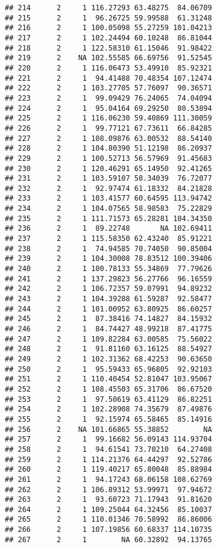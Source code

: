 \documentclass[
]{article}
\begin{document}
\begin{verbatim}
## 214      2     1 116.27293 63.48275  84.06709
## 215      2     1  96.26725 59.99588  61.31248
## 216      2     1 100.05098 55.27259 101.04213
## 217      2     1 102.24494 60.10248  86.81044
## 218      2     1 122.58310 61.15046  91.98422
## 219      2    NA 102.55585 66.69756  91.52545
## 220      2     1 116.06473 53.49910  85.92321
## 221      2     1  94.41488 70.48354 107.12474
## 222      2     1 103.27705 57.76097  90.36571
## 223      2     1  99.09429 76.24065  74.04094
## 224      2     1  95.04164 69.29250  80.53894
## 225      2     1 116.06230 59.40869 111.30059
## 226      2     1  99.77121 67.73611  66.84285
## 227      2     1 108.09876 63.00532  88.54140
## 228      2     1 104.80390 51.12198  86.20937
## 229      2     1 100.52713 56.57969  91.45683
## 230      2     1 120.46291 65.14950  92.41265
## 231      2     1 103.59107 58.34039  76.72077
## 232      2     1  92.97474 61.18332  84.21828
## 233      2     1 103.41577 60.64595 113.94742
## 234      2     1 104.07565 58.98583  75.22829
## 235      2     1 111.71573 65.28281 104.34350
## 236      2     1  89.22748       NA 102.69411
## 237      2     1 115.58350 62.43240  85.91221
## 238      2     1  74.94585 70.74050  90.85004
## 239      2     1 104.30008 78.83512 100.39406
## 240      2     1 100.78133 55.34869  77.79626
## 241      2     1 137.29823 56.27766  96.16559
## 242      2     1 106.72357 59.07991  94.89232
## 243      2     1 104.39288 61.59287  92.58477
## 244      2     1 101.00952 63.80925  86.60257
## 245      2     1  87.38416 74.14827  84.15932
## 246      2     1  84.74427 48.99218  87.41775
## 247      2     1 109.82284 63.00585  75.56022
## 248      2     1  91.81160 63.16125  88.54927
## 249      2     1 102.31362 68.42253  90.63650
## 250      2     1  95.59433 65.96805  92.92103
## 251      2     1 110.40454 52.81047 103.95067
## 252      2     1 108.45503 65.31706  86.67520
## 253      2     1  97.50619 63.41129  86.82251
## 254      2     1 102.28908 74.35679  87.49876
## 255      2     1  92.15974 65.58465  85.14916
## 256      2    NA 101.66865 55.38852        NA
## 257      2     1  99.16682 56.09143 114.93704
## 258      2     1  94.61541 73.70210  64.27408
## 259      2     1 114.21376 64.44297  92.52786
## 260      2     1 119.40217 65.80048  85.88984
## 261      2     1  94.17243 68.06158 108.62769
## 262      2     1 106.89312 53.99971  97.94672
## 263      2     1  93.60723 71.17943  91.81620
## 264      2     1 109.25044 64.32456  85.10037
## 265      2     1 110.01346 70.58992  86.86006
## 266      2     1 107.19856 60.68337 114.10735
## 267      2     1        NA 60.32892  94.13765

\end{verbatim}
\end{document}
